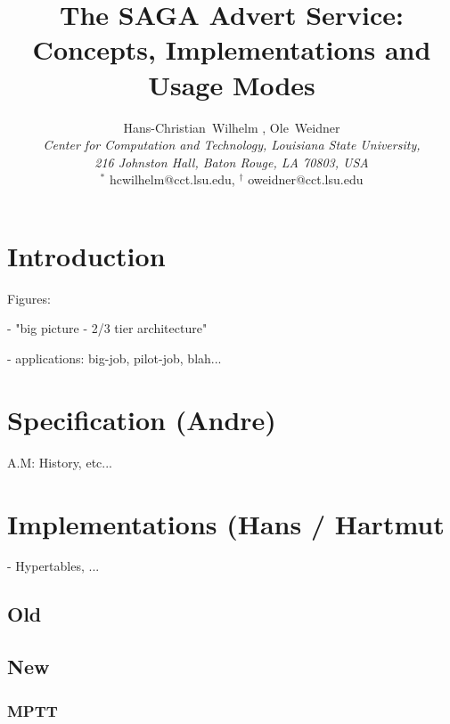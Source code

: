 \documentclass[a4paper,10pt,twocolumn]{article}
\begin{document}
\thispagestyle{plain}
\title{The SAGA Advert Service: Concepts, Implementations and Usage Modes}
\author{Hans-Christian~Wilhelm \footnotemark, Ole~Weidner\footnotemark \\ {\em \small{Center for Computation and Technology, Louisiana State University,}} \\ {\em {\small 216 Johnston Hall, Baton Rouge, LA 70803, USA}}
\\ {\footnotesize $^*$ hcwilhelm@cct.lsu.edu, $^\dag$ oweidner@cct.lsu.edu}}

\date{}

\maketitle


\begin{abstract}

\end{abstract}

\section{Introduction} 

Figures: 

- "big picture - 2/3 tier architecture"

- applications: big-job, pilot-job, blah... 

\section{Specification (Andre)}
A.M: History, etc... 

\section{Implementations (Hans / Hartmut} 

- Hypertables, ... 

\subsection{Old}

\subsection{New}

\subsubsection{MPTT}
\end{document}
